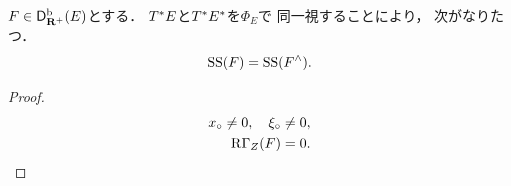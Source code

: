 \begin{leftbar}
\begin{THM}
    \(F\in\Dbconic(E)\)とする．
    \(\cotb[E]\)と\(\cotb[E^{\ast}]\)を\(\varPhi_{E}\)で
    同一視することにより，
    次がなりたつ．
    \[
        \muS(F)=\muS(F^{\wedge}).
    \]
\end{THM}
\end{leftbar}

\begin{proof}
    \begin{align}
        x_{\circ}\ne0,
        \quad
        \xi_{\circ}\ne0,\label{eq:5512}\\
        \RG_{Z}(F)=0.\label{eq:5513}    
    \end{align}
\end{proof}























